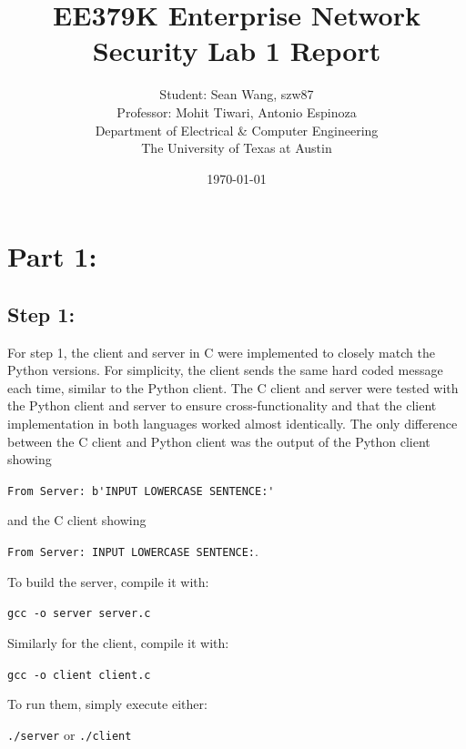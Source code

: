 \documentclass[11pt]{article}
\author{Student: Sean Wang, szw87 \\ Professor: Mohit Tiwari, Antonio Espinoza \\ Department of Electrical \& Computer Engineering \\ The University of Texas at Austin}
\date{\today}
\title{EE379K Enterprise Network Security Lab 1 Report}
\begin{document}
\maketitle
\section*{Part 1:}
\subsection*{Step 1:}
For step 1, the client and server in C were implemented to closely match the Python versions.
For simplicity, the client sends the same hard coded message each time, similar to the Python
client. The C client and server were tested with the Python client and server to ensure
cross-functionality and that the client implementation in both languages worked almost
identically. The only difference between the C client and Python client was the output of the
Python client showing
\begin{center}
  \verb|From Server: b'INPUT LOWERCASE SENTENCE:'|
\end{center}
and the C client showing
\begin{center}
  \verb|From Server: INPUT LOWERCASE SENTENCE:|.
\end{center}
To build the server, compile it with:
\begin{center}
  \verb|gcc -o server server.c|
\end{center}
Similarly for the client, compile it with:
\begin{center}
  \verb|gcc -o client client.c|
\end{center}
To run them, simply execute either:
\begin{center}
  \verb|./server| or \verb|./client|
\end{center}
\end{document}
